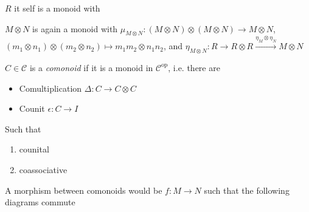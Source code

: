 \documentclass[main]{subfiles}
\begin{document}
\begin{definition}
$R$ it self is a monoid with

$M\otimes N$ is again a monoid with $\mu_{M\otimes N}:(M\otimes N)\otimes(M\otimes N)\to M\otimes N$, $(m_1\otimes n_1)\otimes(m_2\otimes n_2)\mapsto m_1m_2\otimes n_1n_2$, and $\eta_{M\otimes N}:R\to R\otimes R\xrightarrow{\eta_M\otimes\eta_N} M\otimes N$

$C\in\mathscr C$ is a \textit{comonoid} if it is a monoid in $\mathscr C^\mathrm{op}$, i.e. there are
\begin{itemize}
\item Comultiplication $\Delta:C\to C\otimes C$
\item Counit $\epsilon:C\to I$
\end{itemize}
Such that
\begin{enumerate}
\item counital
\begin{center}
\end{center}
\item coassociative
\begin{center}
\end{center}
\end{enumerate}
A morphism between comonoids would be $f:M\to N$ such that the following diagrams commute
\begin{center}
\end{center}


\end{definition}
\end{document}

